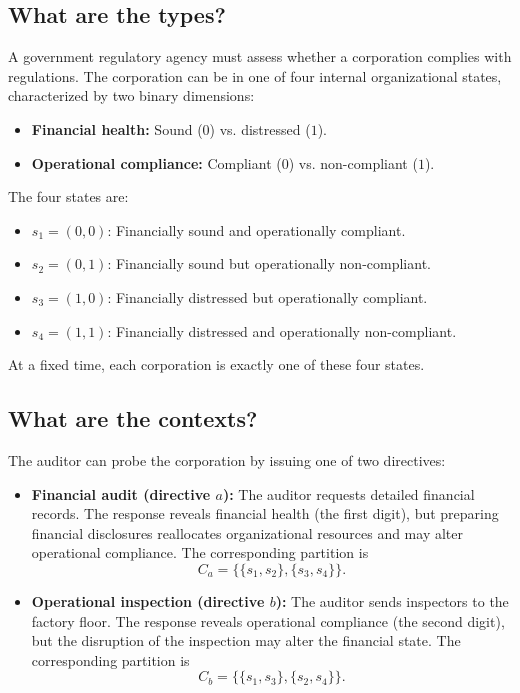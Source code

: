\documentclass{article}
\begin{document}
\subsection{What are the types?}

A government regulatory agency must assess whether a corporation
complies with regulations. The corporation can be in one of four
internal organizational states, characterized by two binary dimensions:
\begin{itemize}
\item \textbf{Financial health:} Sound ($0$) vs. distressed ($1$).
\item \textbf{Operational compliance:} Compliant ($0$) vs.
non-compliant ($1$).
\end{itemize}
The four states are:
\begin{itemize}
\item $s_1=(0,0)$: Financially sound and operationally compliant.
\item $s_2=(0,1)$: Financially sound but operationally non-compliant.
\item $s_3=(1,0)$: Financially distressed but operationally compliant.
\item $s_4=(1,1)$: Financially distressed and operationally
non-compliant.
\end{itemize}
At a fixed time, each corporation is exactly one of these four states.

\subsection{What are the contexts?}

The auditor can probe the corporation by issuing one of two directives:
\begin{itemize}
\item \textbf{Financial audit (directive $a$):} The auditor requests
detailed financial records. The response reveals financial health
(the first digit), but preparing financial disclosures reallocates
organizational resources and may alter operational compliance.
The corresponding partition is
\[
C_a=\{\{s_1,s_2\},\{s_3,s_4\}\}.
\]
\item \textbf{Operational inspection (directive $b$):} The auditor
sends inspectors to the factory floor. The response reveals
operational compliance (the second digit), but the disruption of the
inspection may alter the financial state. The corresponding
partition is
\[
C_b=\{\{s_1,s_3\},\{s_2,s_4\}\}.
\]
\end{itemize}
\end{document}
